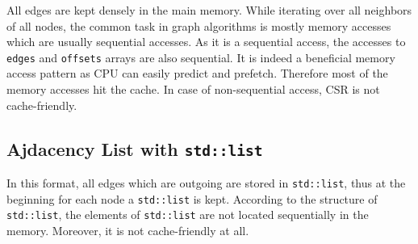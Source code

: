 \documentclass{article}
\begin{document}
\begin{center}

\end{center}

All edges are kept densely in the main memory. While iterating over all neighbors of all nodes, the common task in graph algorithms is mostly memory accesses which are usually sequential accesses. As it is a sequential access, the accesses to \texttt{edges} and \texttt{offsets} arrays are also sequential. It is indeed a beneficial memory access pattern as CPU can easily predict and prefetch. Therefore most of the memory accesses hit the cache. In case of non-sequential access, CSR is not cache-friendly.

\subsection{Ajdacency List with \texttt{std::list}}
In this format, all edges which are outgoing are stored in \texttt{std::list}, thus at the beginning for each node a \texttt{std::list} is kept. According to the structure of \texttt{std::list}, the elements of \texttt{std::list} are not located sequentially in the memory. Moreover, it is not cache-friendly at all. \\
\end{document}
